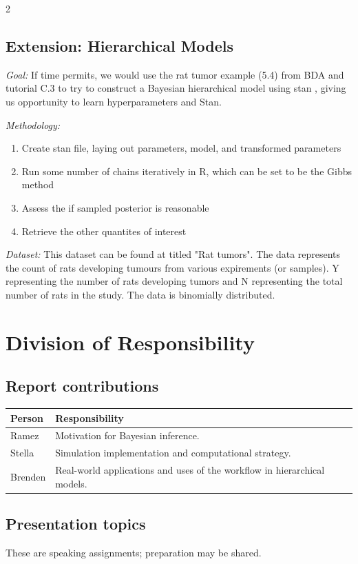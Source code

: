 \documentclass[10pt]{article}
\begin{document}
\begin{multicols*}{2}
\subsection{Extension: Hierarchical Models}
\textit{Goal: }
If time permits, we would use the rat tumor example (5.4) from BDA and tutorial C.3 to try to construct a Bayesian hierarchical model
using stan \cite{gelman_bayesian_2014}, giving us opportunity to learn hyperparameters and Stan.

\noindent\textit{Methodology: }
\begin{enumerate}[nosep]
	\item Create stan file, laying out parameters, model, and transformed parameters
	\item Run some number of chains iteratively in R, which can be set to be the Gibbs method
	\item Assess the if sampled posterior is reasonable
	\item Retrieve the other quantites of interest
\end{enumerate}
\noindent\textit{Dataset: }
This dataset can be found at \citet{datasets_BDA} titled "Rat tumors". The data represents the count of rats developing tumours from various
expirements (or samples). Y representing the number of rats developing tumors and N representing the total number of rats in the study. 
The data is binomially distributed.
\section*{Division of Responsibility}
\subsection*{Report contributions}
\begingroup
\small
\setlength{\tabcolsep}{4pt}
\renewcommand{\arraystretch}{1.18}
\noindent\begin{tabularx}{\linewidth}{@{}p{1.25cm}>{\raggedright\arraybackslash}X@{}}
\hline
\textbf{Person} & \textbf{Responsibility} \\ \hline
Ramez & Motivation for Bayesian inference. \\[4pt]
Stella & Simulation implementation and computational strategy. \\[4pt]
Brenden & Real-world applications and uses of the workflow in hierarchical models. \\ \hline
\end{tabularx}
\par
\endgroup
\subsection*{Presentation topics}
These are speaking assignments; preparation may be shared.


\end{multicols*}
\end{document}

